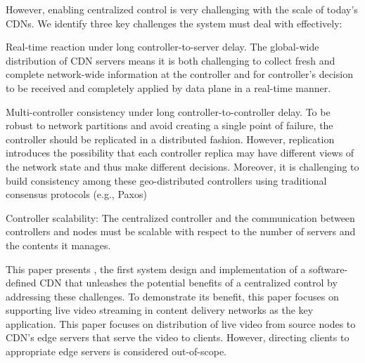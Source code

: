 However, enabling centralized control is very challenging with the scale of today's CDNs.
We identify three key challenges the system must deal with effectively:
\begin{packeditemize}
\item Real-time reaction under long controller-to-server delay. The
global-wide distribution of CDN servers means it is both challenging to
collect fresh and complete network-wide information at the controller
and for controller's decision to be received and completely
applied by data plane in a real-time manner. 
\item Multi-controller consistency under long controller-to-controller delay. To be robust to network partitions and avoid creating a single point of failure, the
controller should be replicated in a distributed fashion.
However, replication introduces the possibility that each
controller replica may have different views of the network
state and thus make different decisions.
Moreover, it is challenging to build consistency among these
geo-distributed controllers using traditional consensus
protocols (e.g., Paxos)
\item Controller scalability: The centralized controller and the
communication between controllers and nodes must be scalable
with respect to the number of servers and the contents it
manages.
\end{packeditemize}

This paper presents {\it \SDCDN}, the first system design and
implementation of a software-defined CDN that unleashes the
potential benefits of a centralized control by addressing these
challenges. To demonstrate its benefit, this paper focuses on
supporting live video streaming in content delivery networks as
the key application.
This paper focuses on distribution of live video from source
nodes to CDN's edge servers that serve the video to clients.
However, directing clients to appropriate edge servers is
considered out-of-scope.

